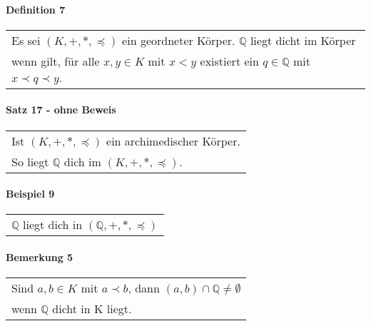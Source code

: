 \documentclass[a4paper]{scrartcl}
\begin{document}
\paragraph{Definition 7}
\begin{tabbing}
\begin{tabular}{l}
Es sei $(K,+,*,\preceq)$ ein geordneter Körper. $\mathbb{Q}$ liegt dicht im Körper\\
wenn gilt, für alle $x,y\in K$ mit $x<y$ existiert ein $q\in\mathbb{Q}$ mit $x\prec q\prec y$.
\end{tabular}
\end{tabbing}

\paragraph{Satz 17 - ohne Beweis}
\begin{tabbing}
\begin{tabular}{l}
Ist $(K,+,*,\preceq)$ ein archimedischer Körper.\\
So liegt $\mathbb{Q}$ dich im $(K,+,*,\preceq)$.
\end{tabular}
\end{tabbing}

\paragraph{Beispiel 9}
\begin{tabbing}
\begin{tabular}{l}
$\mathbb{Q}$ liegt dich in $(\mathbb{Q},+,*,\preceq)$
\end{tabular}
\end{tabbing}

\paragraph{Bemerkung 5}
\begin{tabbing}
\begin{tabular}{l}
Sind $a,b\in K$ mit $a\prec b$, dann $(a,b)\cap\mathbb{Q\neq\emptyset}$\\
wenn $\mathbb{Q}$ dicht in K liegt.
\end{tabular}
\end{tabbing}
\end{document}
